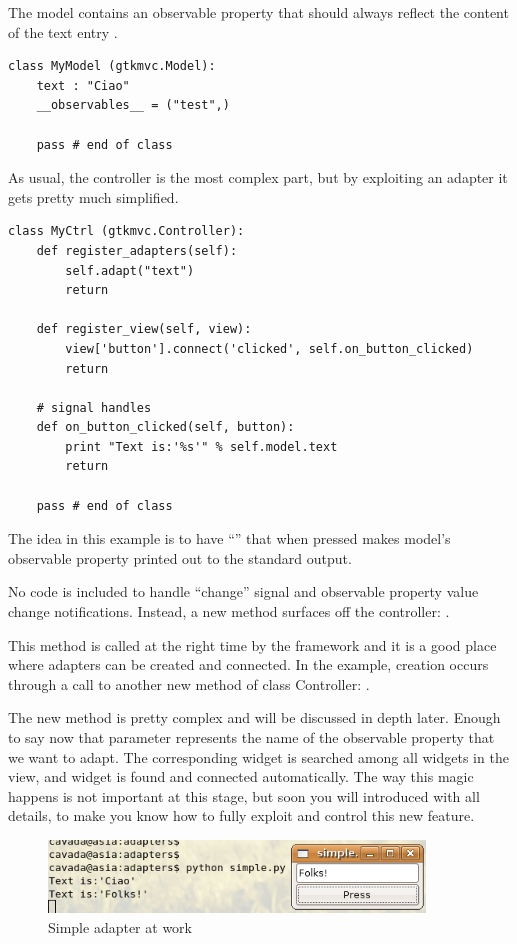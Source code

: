 The model contains an observable property that should always 
reflect the content of the text entry .

{ \codesize
\begin{verbatim}
class MyModel (gtkmvc.Model):
    text : "Ciao"
    __observables__ = ("test",)

    pass # end of class
\end{verbatim}
}

As usual, the controller is the most complex part, but by exploiting
an adapter it gets pretty much simplified. 
{ \codesize
\begin{verbatim}
class MyCtrl (gtkmvc.Controller):
    def register_adapters(self):
        self.adapt("text")
        return

    def register_view(self, view):
        view['button'].connect('clicked', self.on_button_clicked)
        return

    # signal handles
    def on_button_clicked(self, button):
        print "Text is:'%s'" % self.model.text
        return

    pass # end of class
\end{verbatim}
}

The idea in this example is to have ``''
that when pressed makes model's observable property 
printed out to the standard output.

No code is included to handle  ``change''
signal and observable property value change notifications. Instead,
a new method surfaces off the controller:
.

This method is called at the right time by the framework and it is a
good place where adapters can be created and connected. In the
example, creation occurs through a call to another new method of
class Controller: . 

The new method is pretty complex and will be discussed in depth
later. Enough to say now that parameter 
represents the name of the observable property that we want to
adapt. The corresponding widget is searched among all widgets in the
view, and widget  is found and connected
automatically. The way this magic happens is not important at this
stage, but soon you will introduced with all details, to make you
know how to fully exploit and control this new feature.

\begin{figure}[htbp]
\begin{center}
\includegraphics[width=10cm]{figs/png/adap1}
\caption{\label{ADAP1_f} Simple adapter at work}
\end{center}
\end{figure}


